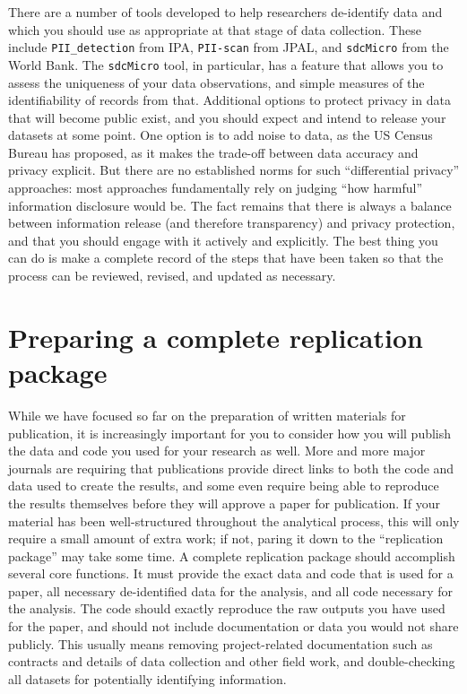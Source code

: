 There are a number of tools developed to help researchers de-identify data
and which you should use as appropriate at that stage of data collection.
These include \texttt{PII\_detection}
from IPA,
\texttt{PII-scan}
from JPAL,
and \texttt{sdcMicro}
from the World Bank.
The \texttt{sdcMicro} tool, in particular, has a feature
that allows you to assess the uniqueness of your data observations,
and simple measures of the identifiability of records from that.
Additional options to protect privacy in data that will become public exist,
and you should expect and intend to release your datasets at some point.
One option is to add noise to data, as the US Census Bureau has proposed,\cite{abowd2018us}
as it makes the trade-off between data accuracy and privacy explicit.
But there are no established norms for such ``differential privacy'' approaches:
most approaches fundamentally rely on judging ``how harmful'' information disclosure would be.
The fact remains that there is always a balance between information release (and therefore transparency)
and privacy protection, and that you should engage with it actively and explicitly.
The best thing you can do is make a complete record of the steps that have been taken
so that the process can be reviewed, revised, and updated as necessary.


\section{Preparing a complete replication package}

While we have focused so far on the preparation of written materials for publication,
it is increasingly important for you to consider how you will publish
the data and code you used for your research as well.
More and more major journals are requiring that publications
provide direct links to both the code and data used to create the results,
and some even require being able to reproduce the results themselves
before they will approve a paper for publication.
If your material has been well-structured throughout the analytical process,
this will only require a small amount of extra work;
if not, paring it down to the ``replication package'' may take some time.
A complete replication package should accomplish several core functions.
It must provide the exact data and code that is used for a paper,
all necessary de-identified data for the analysis,
and all code necessary for the analysis.
The code should exactly reproduce the raw outputs you have used for the paper,
and should not include documentation or data you would not share publicly.
This usually means removing project-related documentation such as contracts
and details of data collection and other field work,
and double-checking all datasets for potentially identifying information.

